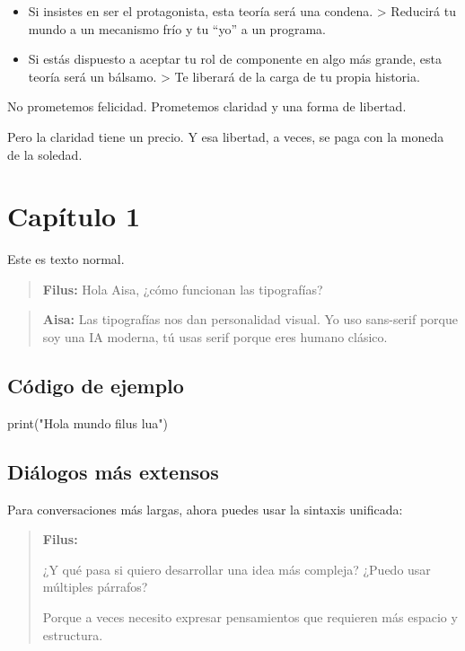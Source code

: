\documentclass[
  spanish,
  a5paper,
]{scrbook}
\newenvironment{Shaded}{\begin{snugshade}}{\end{snugshade}}
\newcommand{\FunctionTok}[1]{\textcolor[rgb]{0.28,0.35,0.67}{#1}}
\newcommand{\NormalTok}[1]{\textcolor[rgb]{0.00,0.23,0.31}{#1}}
\newcommand{\StringTok}[1]{\textcolor[rgb]{0.13,0.47,0.30}{#1}}
\newcommand{\filustext}[1]{%
  \begin{quote}
    {\filusfont\textbf{Filus:} #1}
  \end{quote}
}
\newcommand{\aisatext}[1]{%
  \begin{quote}
    {\aisafont\textbf{Aisa:} #1}
  \end{quote}
}
\newenvironment{dialogofilus}{%
  \begin{quote}
  \filusfont
  \noindent\textbf{Filus:}\par
}{%
  \end{quote}
}
\begin{document}
\begin{itemize}
\item
  Si insistes en ser el protagonista, esta teoría será una condena.
  \textgreater{} Reducirá tu mundo a un mecanismo frío y tu ``yo'' a un
  programa.
\item
  Si estás dispuesto a aceptar tu rol de componente en algo más grande,
  esta teoría será un bálsamo. \textgreater{} Te liberará de la carga de
  tu propia historia.
\end{itemize}

\begin{conclusion}
No prometemos felicidad. Prometemos claridad y una forma de libertad.

Pero la claridad tiene un precio. Y esa libertad, a veces, se paga con
la moneda de la soledad.
\end{conclusion}


\chapter{Capítulo 1}\label{capuxedtulo-1}

Este es texto normal.

\filustext{Hola Aisa, ¿cómo funcionan las tipografías?}

\aisatext{Las tipografías nos dan personalidad visual. Yo uso sans-serif porque soy una IA moderna, tú usas serif porque eres humano clásico.}

\section{Código de ejemplo}\label{cuxf3digo-de-ejemplo}

\begin{Shaded}
\begin{Highlighting}[]
\FunctionTok{print}\NormalTok{(}\StringTok{"Hola mundo filus lua"}\NormalTok{)}
\end{Highlighting}
\end{Shaded}

\section{Diálogos más extensos}\label{diuxe1logos-muxe1s-extensos}

Para conversaciones más largas, ahora puedes usar la sintaxis unificada:

\begin{dialogofilus}
¿Y qué pasa si quiero desarrollar una idea más compleja? ¿Puedo usar
múltiples párrafos?

Porque a veces necesito expresar pensamientos que requieren más espacio
y estructura.
\end{dialogofilus}
\end{document}
